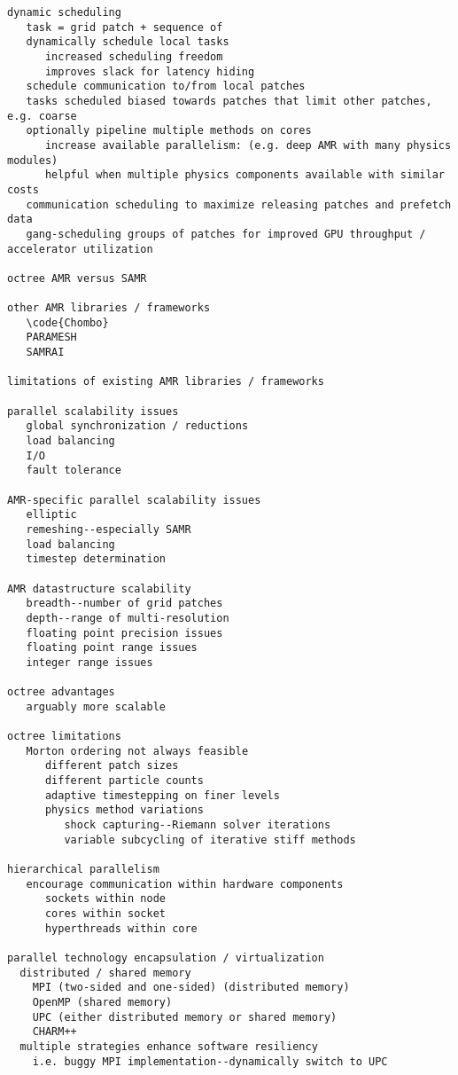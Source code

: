 \documentclass[14pt,letter]{article}
\begin{document}
\begin{verbatim}
dynamic scheduling
   task = grid patch + sequence of 
   dynamically schedule local tasks
      increased scheduling freedom
      improves slack for latency hiding
   schedule communication to/from local patches
   tasks scheduled biased towards patches that limit other patches, e.g. coarse
   optionally pipeline multiple methods on cores
      increase available parallelism: (e.g. deep AMR with many physics modules)
      helpful when multiple physics components available with similar costs
   communication scheduling to maximize releasing patches and prefetch data
   gang-scheduling groups of patches for improved GPU throughput / accelerator utilization

octree AMR versus SAMR   

other AMR libraries / frameworks
   \code{Chombo}
   PARAMESH
   SAMRAI

limitations of existing AMR libraries / frameworks

parallel scalability issues
   global synchronization / reductions
   load balancing
   I/O
   fault tolerance

AMR-specific parallel scalability issues
   elliptic
   remeshing--especially SAMR
   load balancing
   timestep determination

AMR datastructure scalability
   breadth--number of grid patches
   depth--range of multi-resolution
   floating point precision issues
   floating point range issues
   integer range issues

octree advantages
   arguably more scalable

octree limitations
   Morton ordering not always feasible
      different patch sizes
      different particle counts
      adaptive timestepping on finer levels
      physics method variations
         shock capturing--Riemann solver iterations
         variable subcycling of iterative stiff methods

hierarchical parallelism
   encourage communication within hardware components
      sockets within node
      cores within socket
      hyperthreads within core

parallel technology encapsulation / virtualization
  distributed / shared memory
    MPI (two-sided and one-sided) (distributed memory)
    OpenMP (shared memory) 
    UPC (either distributed memory or shared memory)
    CHARM++
  multiple strategies enhance software resiliency
    i.e. buggy MPI implementation--dynamically switch to UPC


\end{verbatim}
\end{document}
